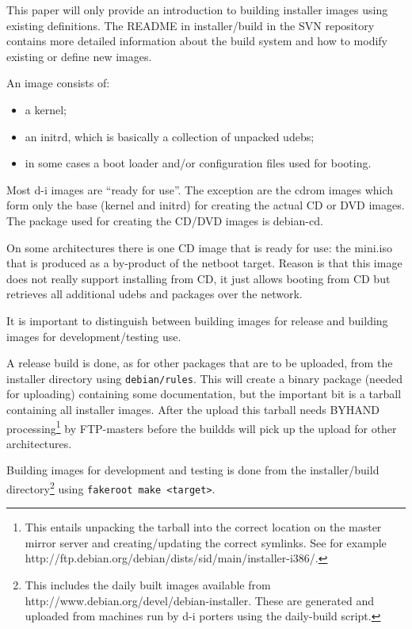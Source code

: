 \documentclass[a4paper,10pt]{article}
\begin{document}
This paper will only provide an introduction to building installer images using existing definitions. The README in installer/build in the SVN repository contains more detailed information about the build system and how to modify existing or define new images. 

An image consists of: 

\begin{itemize}
\item a kernel; 
\item an initrd, which is basically a collection of unpacked udebs; 
\item in some cases a boot loader and/or configuration files used for booting.
\end{itemize}

Most d-i images are “ready for use”. The exception are the cdrom images which form only the base (kernel and initrd) for creating the actual CD or DVD images. The package used for creating the CD/DVD images is debian-cd. 

On some architectures there is one CD image that is ready for use: the mini.iso that is produced as a by-product of the netboot target. Reason is that this image does not really support installing from CD, it just allows booting from CD but retrieves all additional udebs and packages over the network. 

It is important to distinguish between building images for release and building images for development/testing use. 

A release build is done, as for other packages that are to be uploaded, from the installer directory using \texttt{debian/rules}. This will create a binary package (needed for uploading) containing some documentation, but the important bit is a tarball containing all installer images. After the upload this tarball needs BYHAND processing\footnote{This entails unpacking the tarball into the correct location on the master mirror server and creating/updating the correct symlinks. See for example http://ftp.debian.org/debian/dists/sid/main/installer-i386/.} by FTP-masters before the buildds will pick up the upload for other architectures. 

Building images for development and testing is done from the installer/build directory\footnote{This includes the daily built images available from http://www.debian.org/devel/debian-installer. These are generated and uploaded from machines run by d-i porters using the daily-build script.} using \texttt{fakeroot make <target>}. 
\end{document}
